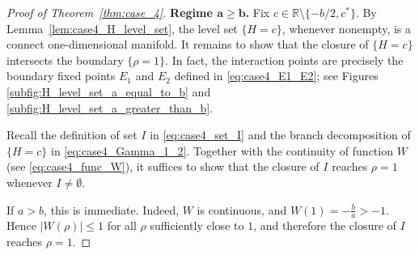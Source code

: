 \documentclass[10pt]{article}
\theoremstyle{definition}
\theoremstyle{definition}
\numberwithin{equation}{section}
\newcommand{\R}{\mathbb{R}}
\begin{document}
\begin{proof}[Proof of Theorem~\ref{thm:case_4}]
\textbf{Regime $\mathbf{a \geq b}$.} 
Fix $c \in \R \setminus \{-b/2, c^*\}$.
By Lemma~\ref{lem:case4_H_level_set}, the level set $\{H=c\}$, whenever nonempty, is a connect one-dimensional manifold.
It remains to show that the closure of $\{H=c\}$ intersects the boundary $\{\rho=1\}$.
In fact, the interaction points are precisely the boundary fixed points $E_1$ and $E_2$ defined in \eqref{eq:case4_E1_E2}; see Figures \ref{subfig:H_level_set_a_equal_to_b} and \ref{subfig:H_level_set_a_greater_than_b}.

Recall the definition of set $I$ in \eqref{eq:case4_set_I} and the branch decomposition of $\{H = c\}$ in \eqref{eq:case4_Gamma_1_2}. 
Together with the continuity of function $W$ (see \eqref{eq:case4_func_W}), it suffices to show that the closure of $I$ reaches $\rho=1$ whenever $I \neq \emptyset$.

If $a > b$, this is immediate.
Indeed, $W$ is continuous, and $W(1) = -\frac{b}{a} > -1$.
Hence $|W(\rho)| \leq 1$ for all $\rho$ sufficiently close to $1$, and therefore the closure of $I$ reaches $\rho=1$.


\end{proof}
\end{document}
